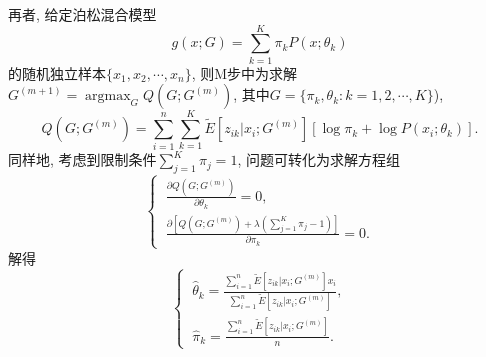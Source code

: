 \documentclass[a4paper,12pt,openany,oneside,utf-8]{ctexbook}
\begin{document}
再者, 给定泊松混合模型
\begin{equation*}
\label{equ:poisson mixture model}
  g(x; G)=\sum_{k=1}^{K} \pi_{k} P(x;\theta_{k})
\end{equation*}
的随机独立样本$\{x_1, x_2, \cdots, x_n\}$, 则M步中为求解$G^{(m+1)}=\mathop{\arg\max}_{G} Q(G;G^{(m)})$, 其中$G=\{\pi_{k},\theta_{k}: k=1, 2, \cdots, K\}$),
\begin{equation}
\label{equ:Q function in poisson mixture model}
  Q(G;G^{(m)})=\sum_{i=1}^{n} \sum_{k=1}^{K} \tilde{E}[z_{ik}|x_i;G^{(m)}] [ \log \pi_{k} + \log P(x_{i}; \theta_{k}) ].
\end{equation}
同样地, 考虑到限制条件$\sum_{j=1}^{K} \pi_j =1$, 问题可转化为求解方程组
\[
\begin{cases}
 \ \frac{\partial Q(G;G^{(m)})}{\partial \theta_{k}} =0, \\
 \ \frac{\partial [Q(G;G^{(m)})+\lambda(\sum_{j=1}^{K}\pi_j-1)]}{\partial \pi_{k}} =0.
\end{cases}
\]
解得
\[
\begin{cases}
 \ \hat{\theta}_{k} = \frac{\sum_{i=1}^{n} \tilde{E}[z_{ik}|x_i;G^{(m)}] x_i}{\sum_{i=1}^{n} \tilde{E}[z_{ik}|x_i;G^{(m)}]}, \\
 \ \hat{\pi}_{k} = \frac{\sum_{i=1}^{n} \tilde{E}[z_{ik}|x_i;G^{(m)}]}{n}.
\end{cases}
\]








%
%
%
%
%



%
%
\end{document}
